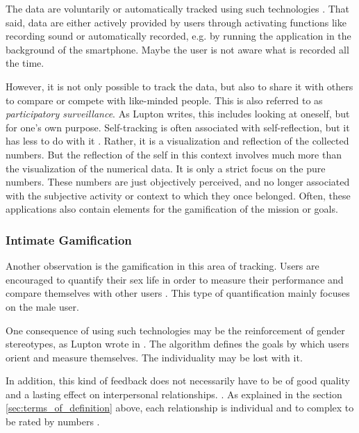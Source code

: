 The data are voluntarily or automatically tracked using such technologies \cite{doi:10.1080/15265161.2017.1409823}. That said, data are either actively provided by users through activating functions like recording sound or automatically recorded, e.g. by running the application in the background of the smartphone. Maybe the user is not aware what is recorded all the time. 

However, it is not only possible to track the data, but also to share it with others to compare or compete with like-minded people.
This is also referred to as \textit{participatory surveillance}. As Lupton \cite{doi:10.1080/13691058.2014.920528} writes, this includes looking at oneself, but for one's own purpose. Self-tracking is often associated with self-reflection, but it has less to do with it \cite{lupton2016quantified}. Rather, it is a visualization and reflection of the collected numbers. But the reflection of the self in this context involves much more than the visualization of the numerical data. It is only a strict focus on the pure numbers. These numbers are just objectively perceived, and no longer associated with the subjective activity or context to which they once belonged.
Often, these applications also contain elements for the gamification of the mission or goals.

\subsubsection{Intimate Gamification}
Another observation is the gamification in this area of tracking. Users are encouraged to quantify their sex life in order to measure their performance and compare themselves with other users \cite{doi:10.1080/13691058.2014.920528}. This type of quantification mainly focuses on the male user.

One consequence of using such technologies may be the reinforcement of gender stereotypes, as Lupton wrote in \cite{doi:10.1080/13691058.2014.920528}. The algorithm defines the goals by which users orient and measure themselves. The individuality may be lost with it.

In addition, this kind of feedback does not necessarily have to be of good quality and a lasting effect on interpersonal relationships. \cite{doi:10.1080/15265161.2017.1409823}.
As explained in the section \ref{sec:terms_of_definition} above, each relationship is individual and to complex to be rated by numbers \cite{sassler2010partnering}.

